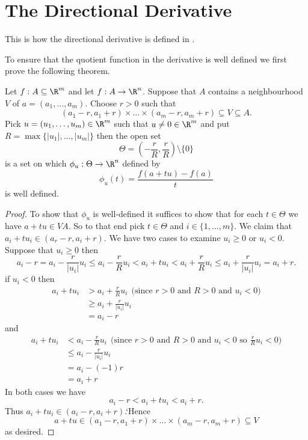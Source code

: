		\section{The Directional Derivative}
		
		This is how the directional derivative is defined in \cite{munkres2018analysis}.
		
		To ensure that the quotient function in the derivative is well defined we first prove the following theorem.
		
		\begin{theorem}
		Let $f : A\subseteq \R^m$ and let $f : A \to \R^n$. Suppose that $A$ contains a neighbourhood $V$ of $a = (a_1, \dots, a_m)$. Choose $r > 0$ such that $$(a_1 -r, a_1 + r) \times \dots \times (a_m -r, a_m+r) \subseteq V \subseteq A.$$ Pick $u =(u_1, \dots, u_m) \in \R^m$ such that $u \neq 0 \in \R^m$ and put $R = \max\{|u_1|, \dots, |u_m|\}$ then the open set $$\Theta = \left(-\frac{r}{R}, \frac{r}{R} \right) \setminus \{0\}$$ is a set on which $\phi_{u} :  \Theta \to \R^n$ defined by $$\phi_{u}(t) = \frac{f(a+tu)-f(a)}{t}$$  is well defined.
		\end{theorem}
		
			\begin{proof}
				To show that $\phi_{u}$ is well-defined it suffices to show that for each $t \in \Theta$ we have $a+ tu \in VA$. So to that end pick $t \in \Theta$ and $i \in \{1, \dots, m\}$. We claim that $a_i + tu_i \in (a_r-r, a_i+r)$. We have two cases to examine $u_i \geq 0$ or $u_i < 0$. Suppose that $u_i \geq 0$ then $$a_i -r = a_i - \frac{r}{|u_i|}u_i \leq a_i - \frac{r}{R}u_i < a_i + tu_i < a_i + \frac{r}{R}u_i \leq a_i + \frac{r}{|u_i|}u_i = a_i + r.$$
				if $u_i < 0$ then 
				\begin{align*}
				a_i + tu_i &> a_i + \frac{r}{R}u_i \ \ \text{(since $r > 0$ and $R > 0$ and $u_i < 0$)} \\
				&\geq a_i + \frac{r}{|u_i|}u_i \\ 
				&= a_i -r
				\end{align*}
				and 
				\begin{align*}
				a_i + tu_i &< a_i - \frac{r}{R}u_i \ \ \text{(since $r > 0$ and $R > 0$ and $u_i < 0$ so $\frac{r}{R}u_i < 0$)} \\
				& \leq a_i - \frac{r}{|u_i|}u_i \\
				&= a_i - (-1)r \\
				&= a_i + r
				\end{align*}
				In both cases we have $$a_i -r <a_i + tu_i < a_i + r.$$ Thus $a_i + tu_i \in (a_i-r, a_i+r)$.`Hence $$a + tu \in  (a_1 -r, a_1 + r) \times \dots \times (a_m -r, a_m+r) \subseteq V$$ as desired.
			\end{proof}
			

